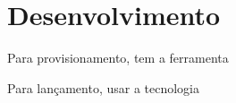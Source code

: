 \chapter{Desenvolvimento}

Para provisionamento, tem a ferramenta 

Para lançamento, usar a tecnologia
